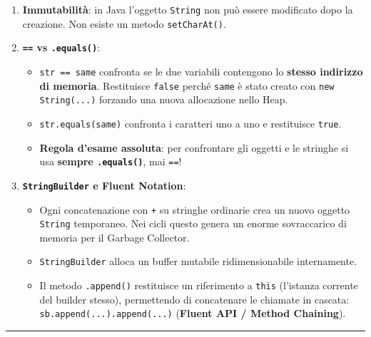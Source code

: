 \documentclass[11pt,a4paper]{article}
\newcommand{\passthrough}[1]{#1}
\providecommand{\tightlist}{\setlength{\itemsep}{0pt}\setlength{\parskip}{0pt}}
\begin{document}
\begin{enumerate}
\def\labelenumi{\arabic{enumi}.}
\tightlist
\item
  \textbf{Immutabilità}: in Java l'oggetto
  \passthrough{\lstinline!String!} non può essere modificato dopo la
  creazione. Non esiste un metodo \passthrough{\lstinline!setCharAt()!}.
\item
  \textbf{\passthrough{\lstinline!==!} vs
  \passthrough{\lstinline!.equals()!}}:

  \begin{itemize}
  \tightlist
  \item
    \passthrough{\lstinline!str == same!} confronta se le due variabili
    contengono lo \textbf{stesso indirizzo di memoria}. Restituisce
    \passthrough{\lstinline!false!} perché
    \passthrough{\lstinline!same!} è stato creato con
    \passthrough{\lstinline!new String(...)!} forzando una nuova
    allocazione nello Heap.
  \item
    \passthrough{\lstinline!str.equals(same)!} confronta i caratteri uno
    a uno e restituisce \passthrough{\lstinline!true!}.
  \item
    \textbf{Regola d'esame assoluta}: per confrontare gli oggetti e le
    stringhe si usa \textbf{sempre \passthrough{\lstinline!.equals()!}},
    mai \passthrough{\lstinline!==!}!
  \end{itemize}
\item
  \textbf{\passthrough{\lstinline!StringBuilder!} e Fluent Notation}:

  \begin{itemize}
  \tightlist
  \item
    Ogni concatenazione con \passthrough{\lstinline!+!} su stringhe
    ordinarie crea un nuovo oggetto \passthrough{\lstinline!String!}
    temporaneo. Nei cicli questo genera un enorme sovraccarico di
    memoria per il Garbage Collector.
  \item
    \passthrough{\lstinline!StringBuilder!} alloca un buffer mutabile
    ridimensionabile internamente.
  \item
    Il metodo \passthrough{\lstinline!.append()!} restituisce un
    riferimento a \passthrough{\lstinline!this!} (l'istanza corrente del
    builder stesso), permettendo di concatenare le chiamate in cascata:
    \passthrough{\lstinline!sb.append(...).append(...)!} (\textbf{Fluent
    API / Method Chaining}).
  \end{itemize}
\end{enumerate}

\begin{center}\rule{0.5\linewidth}{0.5pt}\end{center}
\end{document}

